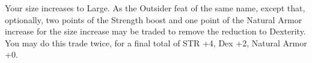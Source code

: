 \shortfeat
{Your size increases to Large.}
{As the Outsider feat of the same name, except that, optionally, two points of the Strength boost and one point of the Natural Armor increase for the size increase may be traded to remove the reduction to Dexterity. You may do this trade twice, for a final total of STR +4, Dex +2, Natural Armor +0.}


